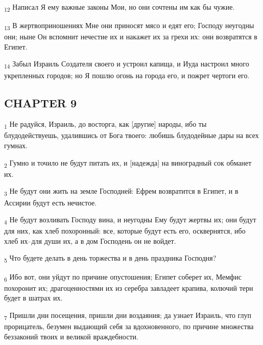 \begin{tcolorbox}
\textsubscript{12} Написал Я ему важные законы Мои, но они сочтены им как бы чужие.
\end{tcolorbox}
\begin{tcolorbox}
\textsubscript{13} В жертвоприношениях Мне они приносят мясо и едят его; Господу неугодны они; ныне Он вспомнит нечестие их и накажет их за грехи их: они возвратятся в Египет.
\end{tcolorbox}
\begin{tcolorbox}
\textsubscript{14} Забыл Израиль Создателя своего и устроил капища, и Иуда настроил много укрепленных городов; но Я пошлю огонь на города его, и пожрет чертоги его.
\end{tcolorbox}
\subsection{CHAPTER 9}
\begin{tcolorbox}
\textsubscript{1} Не радуйся, Израиль, до восторга, как [другие] народы, ибо ты блудодействуешь, удалившись от Бога твоего: любишь блудодейные дары на всех гумнах.
\end{tcolorbox}
\begin{tcolorbox}
\textsubscript{2} Гумно и точило не будут питать их, и [надежда] на виноградный сок обманет их.
\end{tcolorbox}
\begin{tcolorbox}
\textsubscript{3} Не будут они жить на земле Господней: Ефрем возвратится в Египет, и в Ассирии будут есть нечистое.
\end{tcolorbox}
\begin{tcolorbox}
\textsubscript{4} Не будут возливать Господу вина, и неугодны Ему будут жертвы их; они будут для них, как хлеб похоронный: все, которые будут есть его, осквернятся, ибо хлеб их--для души их, а в дом Господень он не войдет.
\end{tcolorbox}
\begin{tcolorbox}
\textsubscript{5} Что будете делать в день торжества и в день праздника Господня?
\end{tcolorbox}
\begin{tcolorbox}
\textsubscript{6} Ибо вот, они уйдут по причине опустошения; Египет соберет их, Мемфис похоронит их; драгоценностями их из серебра завладеет крапива, колючий терн будет в шатрах их.
\end{tcolorbox}
\begin{tcolorbox}
\textsubscript{7} Пришли дни посещения, пришли дни воздаяния; да узнает Израиль, что глуп прорицатель, безумен выдающий себя за вдохновенного, по причине множества беззаконий твоих и великой враждебности.
\end{tcolorbox}
